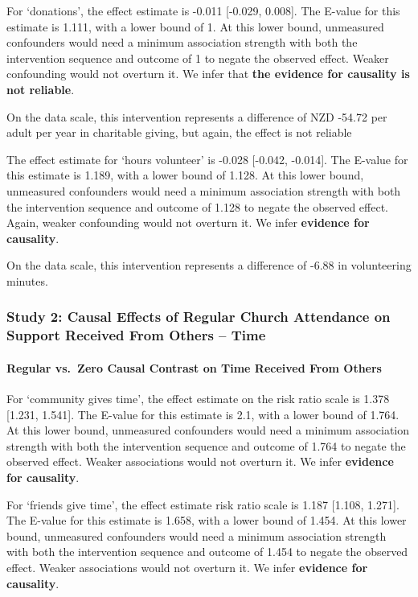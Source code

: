 \documentclass[
  single column]{article}
\let\oldparagraph\paragraph
\renewcommand{\paragraph}[1]{\oldparagraph{#1}\mbox{}}
\begin{document}
For `donations', the effect estimate is -0.011 {[}-0.029, 0.008{]}. The
E-value for this estimate is 1.111, with a lower bound of 1. At this
lower bound, unmeasured confounders would need a minimum association
strength with both the intervention sequence and outcome of 1 to negate
the observed effect. Weaker confounding would not overturn it. We infer
that \textbf{the evidence for causality is not reliable}.

On the data scale, this intervention represents a difference of NZD
-54.72 per adult per year in charitable giving, but again, the effect is
not reliable

The effect estimate for `hours volunteer' is -0.028 {[}-0.042,
-0.014{]}. The E-value for this estimate is 1.189, with a lower bound of
1.128. At this lower bound, unmeasured confounders would need a minimum
association strength with both the intervention sequence and outcome of
1.128 to negate the observed effect. Again, weaker confounding would not
overturn it. We infer \textbf{evidence for causality}.

On the data scale, this intervention represents a difference of -6.88 in
volunteering minutes.

\newpage{}

\subsubsection{Study 2: Causal Effects of Regular Church Attendance on
Support Received From Others --
Time}\label{study-2-causal-effects-of-regular-church-attendance-on-support-received-from-others-time}

\paragraph{Regular vs.~Zero Causal Contrast on Time Received From
Others}\label{regular-vs.-zero-causal-contrast-on-time-received-from-others}

For `community gives time', the effect estimate on the risk ratio scale
is 1.378 {[}1.231, 1.541{]}. The E-value for this estimate is 2.1, with
a lower bound of 1.764. At this lower bound, unmeasured confounders
would need a minimum association strength with both the intervention
sequence and outcome of 1.764 to negate the observed effect. Weaker
associations would not overturn it. We infer \textbf{evidence for
causality}.

For `friends give time', the effect estimate risk ratio scale is 1.187
{[}1.108, 1.271{]}. The E-value for this estimate is 1.658, with a lower
bound of 1.454. At this lower bound, unmeasured confounders would need a
minimum association strength with both the intervention sequence and
outcome of 1.454 to negate the observed effect. Weaker associations
would not overturn it. We infer \textbf{evidence for causality}.
\end{document}
